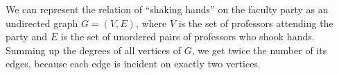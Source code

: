 We can represent the relation of ``shaking hands'' on the faculty party as an undirected graph $G=(V,E)$, where $V$ is the set of professors attending the party and $E$ is the set of unordered pairs of professors who shook hands.
Summing up the degrees of all vertices of $G$, we get twice the number of its edges, because each edge is incident on exactly two vertices.
